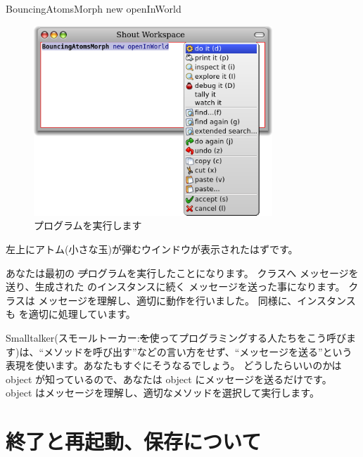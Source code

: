 \documentclass[a4paper,10pt,twoside]{book}
\begin{document}

\begin{code}{}
BouncingAtomsMorph new openInWorld
\end{code}


\begin{figure}[htb]
\centerline {\includegraphics[width=0.8\textwidth]{Doit}}
\caption{プログラムを実行します}
\end{figure}

左上にアトム(小さな玉)が弾むウインドウが表示されたはずです。

あなたは最初の \st プログラムを実行したことになります。
\bam クラスへ  メッセージを送り、生成された \bam のインスタンスに続く  メッセージを送った事になります。
\bam クラスは  メッセージを理解し、適切に動作を行いました。
同様に、\bam インスタンスも  を適切に処理しています。

Smalltalker(スモールトーカー:\st を使ってプログラミングする人たちをこう呼びます)は、``メソッドを呼び出す''などの言い方をせず、``メッセージを送る''という表現を使います。あなたもすぐにそうなるでしょう。
どうしたらいいのかは object が知っているので、あなたは object にメッセージを送るだけです。
object はメッセージを理解し、適切なメソッドを選択して実行します。

\section{終了と再起動、保存について}
\end{document}
